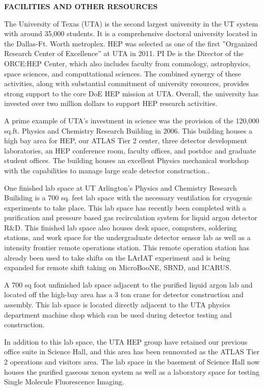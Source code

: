 \begin{center}
\textbf{\LARGE FACILITIES AND OTHER RESOURCES}
\end{center}

The University of Texas (UTA) is the second largest university in the UT system with around 35,000 students. It is a comprehensive doctoral university located in the Dallas-Ft. Worth metroplex. HEP was selected as one of the first ''Organized Research Center of Excellence'' at UTA in 2011. PI De is the Director of the ORCE:HEP Center, which also includes faculty from commology, astrophysics, space sciences, and computtational sciences. The combined synergy of these activities, along with substantial commitment of university resources, provides strong support to the core DoE HEP mission at UTA. Overall, the university has invested over two million dollars to support HEP research activities.

A prime example of UTA's investment in science was the provision of the 120,000 sq.ft. Physics and Chemistry Research Building in 2006.  This building houses a high bay area for HEP, our ATLAS Tier 2 center, three detector development laboratories, an HEP conference room, faculty offices, and postdoc and graduate student offices. The building houses an excellent Physics mechanical workshop with the capabilities to manage large scale detector construction..

One finished lab space at UT Arlington's Physics and Chemistry Research Builiding is a 700 sq. feet lab space with the necessary ventilation for cryogenic experiments to take place. This lab space has recently been completed with a purification and pressure based gas recirculation system for liquid argon detector R$\&$D. This finished lab space also houses desk space, computers, soldering stations, and work space for the undergraduate detector sensor lab as well as a intensity frontier remote operations station. This remote operation station has already been used to take shifts on the LArIAT experiment and is being expanded for remote shift taking on MicroBooNE, SBND, and ICARUS. 

A 700 sq foot unfinished lab space adjacent to the purified liquid argon lab and located off the high-bay area has a 3 ton crane for detector construction and assembly. This lab space is located directly adjacent to the UTA physics department machine shop which can be used during detector testing and construction.

In addition to this lab space, the UTA HEP group have retained our previous office suite in Science Hall, and this area has been rennovated as the ATLAS Tier 2 operations and visitors area. The lab space in the basement of Science Hall now houses the purified gaseous xenon system as well as a laboratory space for testing Single Molecule Fluorescence Imaging.

